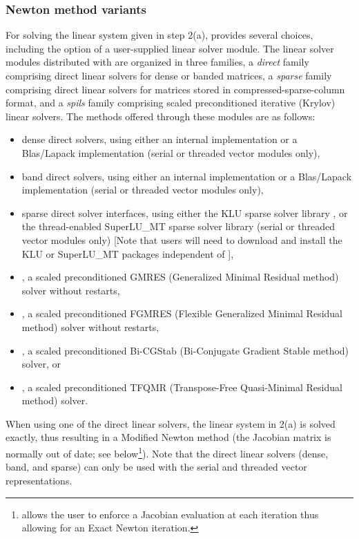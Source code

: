 
\subsubsection*{Newton method variants}
For solving the linear system given in step 2(a), {\kinsol} provides
several choices, including the option of a user-supplied
linear solver module. The linear solver modules distributed with {\sundials}
are organized in three families, a {\em direct} family comprising direct linear 
solvers for dense or banded matrices, a {\em sparse} family comprising
direct linear solvers for matrices stored in compressed-sparse-column
format, and a {\em spils} family comprising scaled preconditioned
iterative (Krylov) linear solvers. 
The methods offered through these modules are as follows:
\begin{itemize}
\item dense direct solvers, using either an internal implementation or 
  a Blas/Lapack implementation (serial or threaded vector modules only),
\item band direct solvers, using either an internal implementation or 
  a Blas/Lapack implementation (serial or threaded vector modules only),
\item sparse direct solver interfaces, using either the KLU sparse solver
  library \cite{DaPa:10,KLU_site}, or the thread-enabled SuperLU\_MT sparse
  solver library \cite{Li:05,DGL:99,SuperLUMT_site} (serial or threaded 
  vector modules only) [Note that users will need to download and install the 
  KLU or SuperLU\_MT packages independent of {\kinsol}],
\item {\spgmr}, a scaled preconditioned GMRES (Generalized Minimal Residual method)
  solver without restarts,
\item {\spfgmr}, a scaled preconditioned FGMRES (Flexible Generalized 
  Minimal Residual method) solver without restarts,
\item {\spbcg}, a scaled preconditioned Bi-CGStab (Bi-Conjugate Gradient Stable
  method) solver, or
\item {\sptfqmr}, a scaled preconditioned TFQMR (Transpose-Free Quasi-Minimal
  Residual method) solver.
\end{itemize}
When using one of the direct linear solvers, the linear system in 2(a) is 
solved exactly, thus resulting in a Modified Newton method (the Jacobian matrix 
is normally out of date; see below\footnote{{\kinsol} allows the user to enforce 
a Jacobian evaluation at each iteration thus allowing for an Exact Newton iteration.}). 
Note that the direct linear solvers (dense, band, and sparse) can only
be used with the serial and threaded vector representations.

